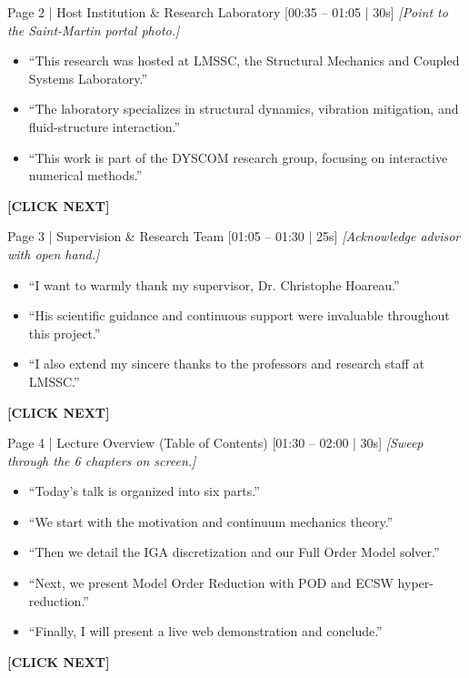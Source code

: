 \documentclass[9pt,a4paper]{article}
\begin{document}
\begin{slidebox}{Page 2 | Host Institution \& Research Laboratory \hfill [00:35 -- 01:05 | 30s]}
\textit{[Point to the Saint-Martin portal photo.]}
\begin{itemize}
  \item ``This research was hosted at LMSSC, the Structural Mechanics and Coupled Systems Laboratory.''
  \item ``The laboratory specializes in structural dynamics, vibration mitigation, and fluid-structure interaction.''
  \item ``This work is part of the DYSCOM research group, focusing on interactive numerical methods.''
\end{itemize}
\textbf{\color{cnamred}[CLICK NEXT]}
\end{slidebox}

\begin{slidebox}{Page 3 | Supervision \& Research Team \hfill [01:05 -- 01:30 | 25s]}
\textit{[Acknowledge advisor with open hand.]}
\begin{itemize}
  \item ``I want to warmly thank my supervisor, Dr. Christophe Hoareau.''
  \item ``His scientific guidance and continuous support were invaluable throughout this project.''
  \item ``I also extend my sincere thanks to the professors and research staff at LMSSC.''
\end{itemize}
\textbf{\color{cnamred}[CLICK NEXT]}
\end{slidebox}

\begin{slidebox}{Page 4 | Lecture Overview (Table of Contents) \hfill [01:30 -- 02:00 | 30s]}
\textit{[Sweep through the 6 chapters on screen.]}
\begin{itemize}
  \item ``Today's talk is organized into six parts.''
  \item ``We start with the motivation and continuum mechanics theory.''
  \item ``Then we detail the IGA discretization and our Full Order Model solver.''
  \item ``Next, we present Model Order Reduction with POD and ECSW hyper-reduction.''
  \item ``Finally, I will present a live web demonstration and conclude.''
\end{itemize}
\textbf{\color{cnamred}[CLICK NEXT]}
\end{slidebox}
\end{document}
